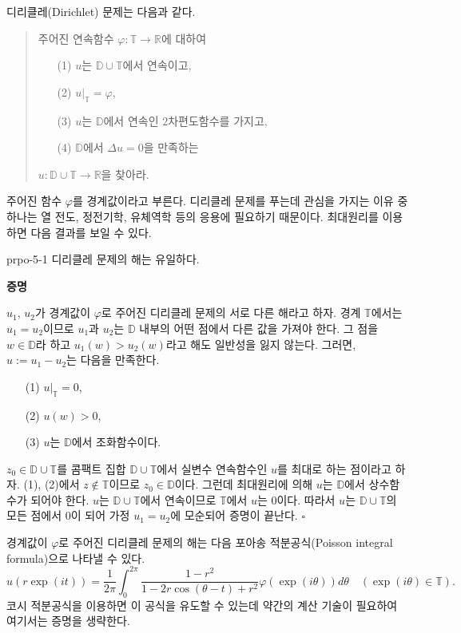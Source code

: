 디리클레(Dirichlet) 문제는 다음과 같다.
\begin{quote}
주어진 연속함수 $\varphi: \mathbb T \to \mathbb R$에 대하여
\begin{itemize}
\item[(1)] $u$는 $\mathbb D \cup \mathbb T$에서 연속이고,
\item[(2)] $u|_{\mathbb T}=\varphi$,
\item[(3)] $u$는 $\mathbb D$에서 연속인 $2$차편도함수를 가지고,
\item[(4)] $\mathbb D$에서 $\Delta u  = 0$을 만족하는
\end{itemize}
$u: \mathbb D \cup \mathbb T \to \mathbb R$을 찾아라.
\end{quote}

주어진 함수 $\varphi$를 경계값이라고 부른다.
디리클레 문제를 푸는데 관심을 가지는 이유 중 하나는
열 전도, 정전기학, 유체역학 등의 응용에 필요하기 때문이다.
최대원리를 이용하면 다음 결과를 보일 수 있다.

\begin{saltprop}[]{prpo-5-1} %
디리클레 문제의 해는 유일하다.
\end{saltprop}

{\bf 증명}

$u_1$, $u_2$가 경계값이 $\varphi$로 주어진 디리클레 문제의 
서로 다른 해라고 하자. 경계 $\mathbb T$에서는 $u_1 = u_2$이므로
$u_1$과 $u_2$는 $\mathbb D$ 내부의 어떤 점에서 다른 값을 가져야 한다.
그 점을 $w\in\mathbb D$라 하고 $u_1(w) > u_2(w)$라고 해도 일반성을 잃지 않는다.
그러면, $u:=u_1 - u_2$는 다음을 만족한다.
\begin{itemize}
\item[(1)] $u|_{\mathbb T}=0$,
\item[(2)] $u(w)>0$,
\item[(3)] $u$는 $\mathbb D$에서 조화함수이다.
\end{itemize}
$z_0\in \mathbb D\cup \mathbb T$를
콤팩트 집합 $ \mathbb D\cup \mathbb T$에서
실변수 연속함수인 $u$를 최대로 하는 점이라고 하자.
(1), (2)에서 $z\not\in \mathbb T$이므로
$z_0\in \mathbb D$이다.
그런데 최대원리에 의해 $u$는 $\mathbb D$에서 상수함수가 되어야 한다.
$u$는  $ \mathbb D\cup \mathbb T$에서 연속이므로
$\mathbb T$에서 $u$는 $0$이다.
따라서 $u$는  $ \mathbb D\cup \mathbb T$의 모든 점에서 $0$이 되어
가정 $u_1 = u_2$에 모순되어 증명이 끝난다.
\hfill  $\square$

\begin{salt_remark}\label{rem-5-1}
경계값이 $\varphi$로 주어진 디리클레 문제의 해는 
다음 포아송 적분공식(Poisson integral formula)으로 나타낼 수 있다.
\[
u(r\exp(it)) = \dfrac1{2\pi} \int_0^{2\pi} 
\dfrac{1-r^2}{1-2r\cos(\theta -t) + r^2} \varphi(\exp(i\theta))d\theta
\quad (\exp(i\theta) \in \mathbb T).
\]
코시 적분공식을 이용하면 이 공식을 유도할 수 있는데
약간의 계산 기술이 필요하여 여기서는 증명을 생략한다.
\end{salt_remark}

